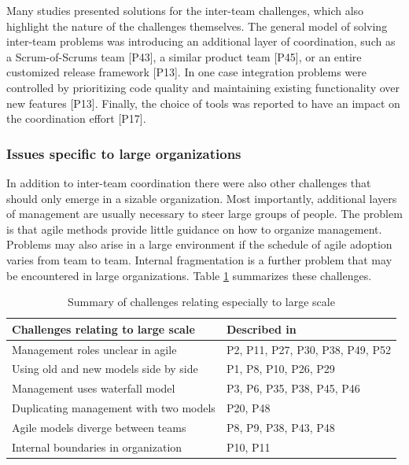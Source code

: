 Many studies presented solutions for the inter-team challenges, which also
highlight the nature of the challenges themselves. The general model of solving
inter-team problems was introducing an additional layer of coordination, such as
a Scrum-of-Scrums team [P43], a similar product team [P45], or an entire
customized release framework [P13]. In one case integration problems were
controlled by prioritizing code quality and maintaining existing functionality
over new features [P13]. Finally, the choice of tools was reported to have an
impact on the coordination effort [P17].



\subsubsection{Issues specific to large organizations}

In addition to inter-team coordination there were also other challenges that
should only emerge in a sizable organization.
Most importantly, additional layers of management are usually necessary to steer
large groups of people. The problem is that agile methods provide little
guidance on how to organize management.
Problems may also arise in a large environment if the schedule of agile adoption
varies from team to team. Internal fragmentation is a further problem that may
be encountered in large organizations.
Table \ref{table:challenges_largescale} summarizes these challenges.

\begin{table}[b]
    \centering
    \begin{tabular}{ >{\raggedright\arraybackslash}p{}
                     >{\raggedright\arraybackslash}p{} }
        \toprule
        Challenges relating to large scale  &  Described in \\
        \midrule
        Management roles unclear in agile       &  P2, P11, P27, P30, P38, P49, P52 \\
        Using old and new models side by side   &  P1, P8, P10, P26, P29 \\
        Management uses waterfall model         &  P3, P6, P35, P38, P45, P46 \\
        Duplicating management with two models  &  P20, P48 \\
        Agile models diverge between teams      &  P8, P9, P38, P43, P48 \\
        Internal boundaries in organization     &  P10, P11 \\
        \bottomrule
    \end{tabular}
    \caption{Summary of challenges relating especially to large scale}
    \label{table:challenges_largescale}
\end{table}

